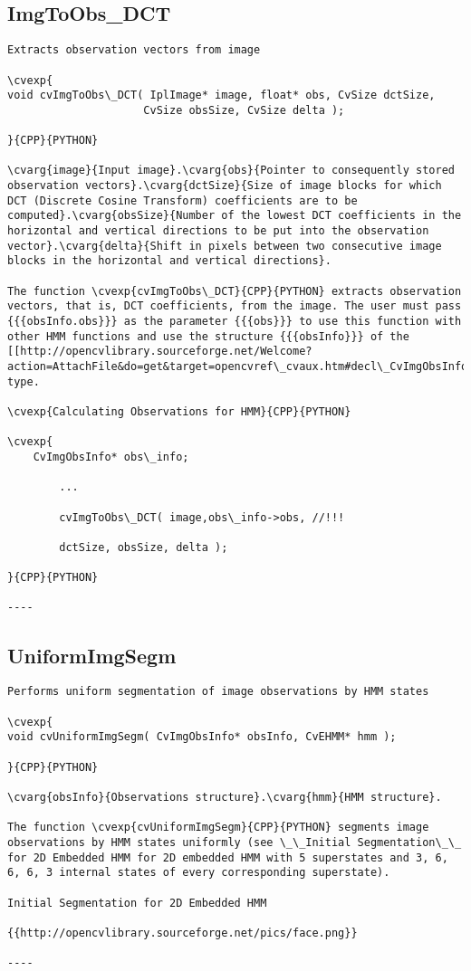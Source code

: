 \subsection{ImgToObs\_DCT}
\begin{verbatim}
Extracts observation vectors from image

\cvexp{
void cvImgToObs\_DCT( IplImage* image, float* obs, CvSize dctSize,
                     CvSize obsSize, CvSize delta );

}{CPP}{PYTHON}

\cvarg{image}{Input image}.\cvarg{obs}{Pointer to consequently stored observation vectors}.\cvarg{dctSize}{Size of image blocks for which DCT (Discrete Cosine Transform) coefficients are to be computed}.\cvarg{obsSize}{Number of the lowest DCT coefficients in the horizontal and vertical directions to be put into the observation vector}.\cvarg{delta}{Shift in pixels between two consecutive image blocks in the horizontal and vertical directions}.

The function \cvexp{cvImgToObs\_DCT}{CPP}{PYTHON} extracts observation vectors, that is, DCT coefficients, from the image. The user must pass {{{obsInfo.obs}}} as the parameter {{{obs}}} to use this function with other HMM functions and use the structure {{{obsInfo}}} of the [[http://opencvlibrary.sourceforge.net/Welcome?action=AttachFile&do=get&target=opencvref\_cvaux.htm#decl\_CvImgObsInfo|CvImgObsInfo]] type.

\cvexp{Calculating Observations for HMM}{CPP}{PYTHON}

\cvexp{
    CvImgObsInfo* obs\_info;

        ...

        cvImgToObs\_DCT( image,obs\_info->obs, //!!!

        dctSize, obsSize, delta );

}{CPP}{PYTHON}

----
\end{verbatim}
\subsection{UniformImgSegm}
\begin{verbatim}
Performs uniform segmentation of image observations by HMM states

\cvexp{
void cvUniformImgSegm( CvImgObsInfo* obsInfo, CvEHMM* hmm );

}{CPP}{PYTHON}

\cvarg{obsInfo}{Observations structure}.\cvarg{hmm}{HMM structure}.

The function \cvexp{cvUniformImgSegm}{CPP}{PYTHON} segments image observations by HMM states uniformly (see \_\_Initial Segmentation\_\_ for 2D Embedded HMM for 2D embedded HMM with 5 superstates and 3, 6, 6, 6, 3 internal states of every corresponding superstate).

Initial Segmentation for 2D Embedded HMM

{{http://opencvlibrary.sourceforge.net/pics/face.png}}

----
\end{verbatim}
